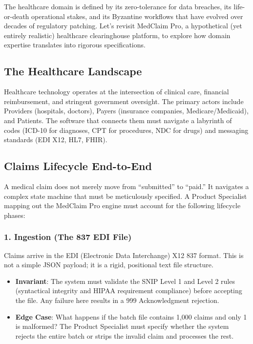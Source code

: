 \documentclass[
  11pt,
  openany,
  oneside]{book}
\providecommand{\tightlist}{%
  \setlength{\itemsep}{0pt}\setlength{\parskip}{0pt}}
\begin{document}
The healthcare domain is defined by its zero-tolerance for data
breaches, its life-or-death operational stakes, and its Byzantine
workflows that have evolved over decades of regulatory patching. Let's
revisit MedClaim Pro, a hypothetical (yet entirely realistic) healthcare
clearinghouse platform, to explore how domain expertise translates into
rigorous specifications.

\subsection{The Healthcare Landscape}\label{the-healthcare-landscape}

Healthcare technology operates at the intersection of clinical care,
financial reimbursement, and stringent government oversight. The primary
actors include Providers (hospitals, doctors), Payers (insurance
companies, Medicare/Medicaid), and Patients. The software that connects
them must navigate a labyrinth of codes (ICD-10 for diagnoses, CPT for
procedures, NDC for drugs) and messaging standards (EDI X12, HL7, FHIR).

\subsection{Claims Lifecycle
End-to-End}\label{claims-lifecycle-end-to-end}

A medical claim does not merely move from ``submitted'' to ``paid.'' It
navigates a complex state machine that must be meticulously specified. A
Product Specialist mapping out the MedClaim Pro engine must account for
the following lifecycle phases:

\subsubsection{1. Ingestion (The 837 EDI
File)}\label{ingestion-the-837-edi-file}

Claims arrive in the EDI (Electronic Data Interchange) X12 837 format.
This is not a simple JSON payload; it is a rigid, positional text file
structure.

\begin{itemize}
\tightlist
\item
  \textbf{Invariant}: The system must validate the SNIP Level 1 and
  Level 2 rules (syntactical integrity and HIPAA requirement compliance)
  before accepting the file. Any failure here results in a 999
  Acknowledgment rejection.
\item
  \textbf{Edge Case}: What happens if the batch file contains 1,000
  claims and only 1 is malformed? The Product Specialist must specify
  whether the system rejects the entire batch or strips the invalid
  claim and processes the rest.
\end{itemize}
\end{document}
